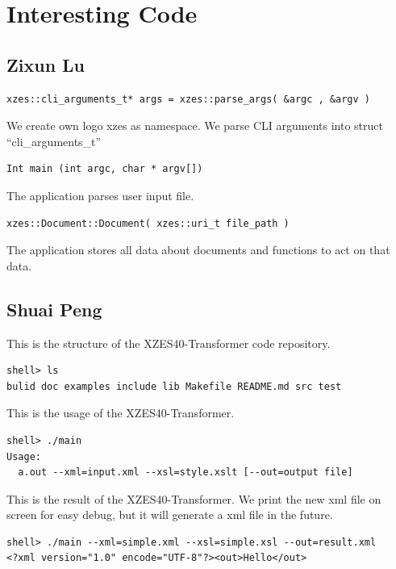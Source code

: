 \section{Interesting Code}

\subsection{Zixun Lu}

\begin{lstlisting}
xzes::cli_arguments_t* args = xzes::parse_args( &argc , &argv )
\end{lstlisting}

We create own logo xzes as namespace. We parse CLI arguments into struct ``cli\_arguments\_t''

\begin{lstlisting}
Int main (int argc, char * argv[])
\end{lstlisting}
The application parses user input file. 

\begin{lstlisting}
xzes::Document::Document( xzes::uri_t file_path )
\end{lstlisting}
The application stores all data about documents and functions to act on that data. 

\subsection{Shuai Peng}

This is the structure of the XZES40-Transformer code repository.

\begin{lstlisting}
shell> ls
bulid doc examples include lib Makefile README.md src test
\end{lstlisting}

This is the usage of the XZES40-Transformer.

\begin{lstlisting}
shell> ./main
Usage:
  a.out --xml=input.xml --xsl=style.xslt [--out=output file]
\end{lstlisting}

This is the result of the XZES40-Transformer. We print the new xml file on screen for easy debug, but it will generate a xml file in the future.

\begin{lstlisting}
shell> ./main --xml=simple.xml --xsl=simple.xsl --out=result.xml
<?xml version="1.0" encode="UTF-8"?><out>Hello</out>
\end{lstlisting}

